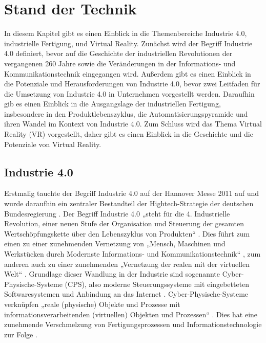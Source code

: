 \chapter{Stand der Technik}\label{cha:StandDerTechnik}

In diesem Kapitel gibt es einen Einblick in die Themenbereiche Industrie 4.0, industrielle Fertigung, und Virtual Reality.
\newline
Zunächst wird der Begriff Industrie 4.0 definiert, bevor auf die Geschichte der industriellen Revolutionen der vergangenen 260 Jahre sowie die Veränderungen in der Informations- und Kommunikationstechnik eingegangen wird. Außerdem gibt es einen Einblick in die Potenziale und Herausforderungen von Industrie 4.0, bevor zwei Leitfaden für die Umsetzung von Industrie 4.0 in Unternehmen vorgestellt werden.
Daraufhin gib es einen Einblick in die Ausgangslage der industriellen Fertigung, insbesondere in den Produktlebenszyklus, die Automatisierungspyramide und ihren Wandel im Kontext von Industrie 4.0.
Zum Schluss wird das Thema Virtual Reality (VR) vorgestellt, daher gibt es einen Einblick in die Geschichte und die Potenziale von Virtual Reality.

\section{Industrie 4.0}\label{sec:Industrie4.0}
Erstmalig tauchte der Begriff Industrie 4.0 auf der Hannover Messe 2011 auf und wurde daraufhin ein zentraler Bestandteil der Hightech-Strategie der deutschen Bundesregierung \cite{8}.
\newline
Der Begriff Industrie 4.0 „steht für die 4. Industrielle Revolution, einer neuen Stufe der Organisation und Steuerung der gesamten Wertschöpfungskette über den Lebenszyklus von Produkten“ \cite{1}. Dies führt zum einen zu einer zunehmenden Vernetzung von „Mensch, Maschinen und Werkstücken durch Modernste Informations- und Kommunikationstechnik“ \cite{6}, zum anderen auch zu einer zunehmenden „Vernetzung der realen mit der virtuellen Welt“ \cite{7}.
\newline
Grundlage dieser Wandlung in der Industrie sind sogenannte Cyber-Physische-Systeme (CPS), also moderne Steuerungssysteme mit eingebetteten Softwaresystemen und Anbindung an das Internet \cite{1}. Cyber-Physische-Systeme verknüpfen „reale (physische) Objekte und Prozesse mit informationsverarbeitenden (virtuellen) Objekten und Prozessen“ \cite{11}. Dies hat eine zunehmende Verschmelzung von Fertigungsprozessen und Informationstechnologie zur Folge \cite{7}.

